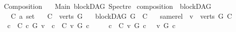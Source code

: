 %
\begin{isabellebody}%
%
%
\isadelimtheory
\isanewline
\isanewline
%
\endisadelimtheory
%
\isatagtheory
{}\isamarkupfalse%
\ Composition\isanewline
\ \ \ Main\ blockDAG\ Spectre\isanewline
{}%
\endisatagtheory
{\isafoldtheory}%
%
\isadelimtheory
%
\endisadelimtheory
%
\isadelimdocument
%
\endisadelimdocument
%
\isatagdocument
%
\isamarkuptrue%
%
\endisatagdocument
{\isafolddocument}%
%
\isadelimdocument
%
\endisadelimdocument
{}\isamarkupfalse%
\ composition\ {\isacharequal}{\kern0pt}\ blockDAG\ \ {\isacharplus}{\kern0pt}\isanewline
\ \ \ C\ {\isacharcolon}{\kern0pt}{\isacharcolon}{\kern0pt}{\isachardoublequoteopen}{\isacharprime}{\kern0pt}a\ set{\isachardoublequoteclose}\isanewline
\ \ \ {\isachardoublequoteopen}C\ {\isasymsubseteq}\ verts\ G{\isachardoublequoteclose}\isanewline
\ \ \ {\isachardoublequoteopen}blockDAG\ {\isacharparenleft}{\kern0pt}G\ {\isasymrestriction}\ C{\isacharparenright}{\kern0pt}{\isachardoublequoteclose}\isanewline
\ \ \ same{\isacharunderscore}{\kern0pt}rel{\isacharcolon}{\kern0pt}\ \ {\isachardoublequoteopen}{\isasymforall}v\ {\isasymin}\ {\isacharparenleft}{\kern0pt}{\isacharparenleft}{\kern0pt}verts\ G{\isacharparenright}{\kern0pt}{\isacharminus}{\kern0pt}\ C{\isacharparenright}{\kern0pt}{\isachardot}{\kern0pt}\ \isanewline
\ \ {\isacharparenleft}{\kern0pt}{\isasymforall}c\ {\isasymin}\ C{\isachardot}{\kern0pt}\ {\isacharparenleft}{\kern0pt}c\ {\isasymrightarrow}\isactrlsup {\isacharasterisk}{\kern0pt}\isactrlbsub G\isactrlesub \ v{\isacharparenright}{\kern0pt}{\isacharparenright}{\kern0pt}\ {\isasymor}\ {\isacharparenleft}{\kern0pt}{\isasymforall}c\ {\isasymin}\ C{\isachardot}{\kern0pt}\ {\isacharparenleft}{\kern0pt}v\ {\isasymrightarrow}\isactrlsup {\isacharasterisk}{\kern0pt}\isactrlbsub G\isactrlesub \ c{\isacharparenright}{\kern0pt}{\isacharparenright}{\kern0pt}\ \isanewline
\ \ \ {\isasymor}\ {\isacharparenleft}{\kern0pt}{\isasymforall}c\ {\isasymin}\ C{\isachardot}{\kern0pt}\ {\isasymnot}{\isacharparenleft}{\kern0pt}v\ {\isasymrightarrow}\isactrlsup {\isacharasterisk}{\kern0pt}\isactrlbsub G\isactrlesub \ c{\isacharparenright}{\kern0pt}\ {\isasymand}\ \ {\isasymnot}{\isacharparenleft}{\kern0pt}v\ {\isasymrightarrow}\isactrlsup {\isacharasterisk}{\kern0pt}\isactrlbsub G\isactrlesub \ c{\isacharparenright}{\kern0pt}{\isacharparenright}{\kern0pt}\ {\isachardoublequoteclose}\ \ \ \ \ \ \ \isanewline

\end{isabellebody}
